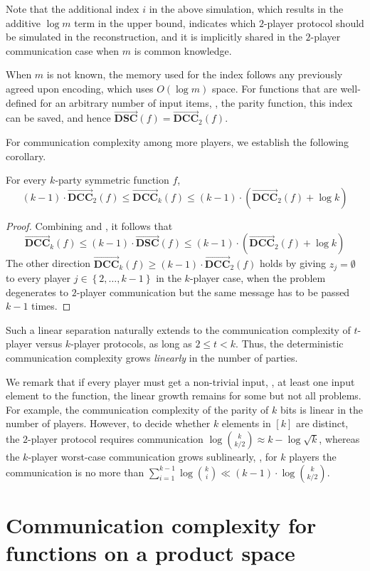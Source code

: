 \documentclass{toc}
\newcommand{\set}[1]{{\left \{{#1} \right \}}}
\newcommand{\dccone}{\ensuremath{\overrightarrow{\mathbf{DCC}}}}
\newcommand{\dscone}{\ensuremath{\overrightarrow{\mathbf{DSC}}}}
\begin{document}
Note that the additional index $i$ in the above simulation, which results in the additive $\log m$ term in the upper bound, indicates which $2$-player protocol should be simulated in the reconstruction,
and it is implicitly shared in the $2$-player communication case when $m$ is common knowledge.

When $m$ is not known, the memory used for the index follows any previously agreed upon encoding, which uses $O(\log m)$ space.
For functions that are well-defined for an arbitrary number of input items,
\eg, the parity function, this index can be saved, and hence $\dscone(f) = \dccone_2(f)$.

For communication complexity among more players, we establish the following corollary.
\begin{corollary}\label{corollary:dcck-dcc2} 
	For every $k$-party symmetric function $f$,		
	\[ (k-1) \cdot \dccone_2(f) \le \dccone_k(f)  \le  (k-1) \cdot \left(\dccone_2(f) +\log k\right) \]
\end{corollary}
\begin{proof}
	Combining  and , it follows that
	\[\dccone_k(f) \le (k-1) \cdot \dscone(f) \le (k-1) \cdot \left(\dccone_2(f) +\log k\right)\]
	The other direction $\dccone_k(f) \ge (k-1) \cdot \dccone_2(f)$ holds by giving $z_j=\emptyset$ to every player $j\in\set{2,\dots, k-1}$ in the $k$-player case, when the problem degenerates to $2$-player communication but the same message has to be passed $k-1$ times. 
\end{proof}

Such a linear separation naturally extends to the communication complexity of $t$-player versus $k$-player protocols, as long as $2\le t<k$.
Thus, the deterministic communication complexity grows \emph{linearly} in the number of parties.

We remark that if every player must get a non-trivial input, \ie, at least one input element to the function, the linear growth remains for some but not all problems.
For example, the communication complexity of the parity of $k$ bits is linear in the number of players.
However, to decide whether $k$ elements in $[k]$ are distinct, the $2$-player protocol requires communication $\log\binom{k}{k/2}\approx k-\log\sqrt{k}$, whereas the $k$-player worst-case communication grows sublinearly, \ie, for $k$ players the communication is no more than $\sum_{i=1}^{k-1} \log\binom{k}{i} \ll (k-1)\cdot \log \binom{k}{k/2}$.


\section{Communication complexity for functions on a product space}
\label{sec:total}
\end{document}
